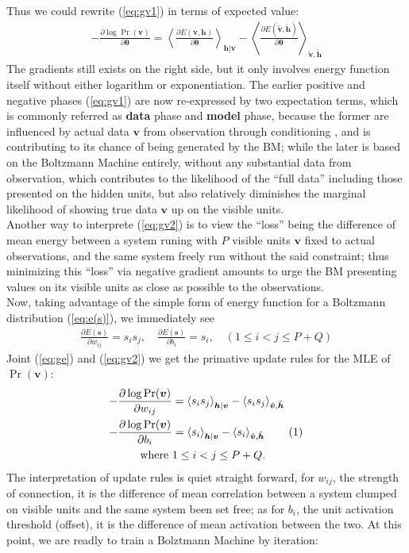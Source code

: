 \documentclass[11pt]{article}
\newcommand{\mean}[2]{\left\langle{#1}\right\rangle_{#2}}
\newcommand\numberthis{\addtocounter{equation}{1}\tag{\theequation}}
\newcommand{\vh}{\boldsymbol{h}}
\newcommand{\vv}{\boldsymbol{v}}
\newcommand{\vs}{\boldsymbol{s}}
\newcommand{\vht}{\tilde{\vh}}
\newcommand{\vvt}{\tilde{\vv}}
\newcommand{\pEC}{\boldsymbol{\theta}}
\newcommand{\PDV}[2]{\frac{\partial #1}{\partial #2}}
\begin{document}
Thus we could rewrite ({\ref{eq:gv1}) in terms of expected value:
\begin{align} \label{eq:gv2}
  -\PDV{\log{\Pr(\vv)}}{\pEC} = \mean{\PDV{E(\vv, \vh)}{\pEC}}{\vh|\vv} - \mean{\PDV{E(\vvt, \vht)}{\pEC}}{\vvt, \vht}
\end{align}
The gradients still exists on the right side, but it only involves energy function itself without either logarithm or exponentiation. The earlier positive and negative phases (\ref{eq:gv1}) are now re-expressed by two expectation terms, which is commonly referred as \textbf{data} phase and \textbf{model} phase, because the former are influenced by actual data $\vv$ from observation through conditioning , and is contributing to its chance of being generated by the BM; while the later is based on the Boltzmann Machine entirely, without any substantial data from observation, which contributes to the likelihood of the ``full data'' including those presented on the hidden units, but also relatively diminishes the marginal likelihood of showing true data $\vv$ up on the visible units. \\
Another way to interprete (\ref{eq:gv2}) is to view the ``loss'' being the difference of mean energy between a system runing with $P$ visible units $\vv$ fixed to actual observations, and the same system freely run without the said constraint; thus minimizing this ``loss'' via negative gradient amounts to urge the BM presenting values on its visible units as close as possible to the observations. \\
Now, taking advantage of the simple form of energy function for a Boltzmann distribution (\ref{eq:e(s)}), we immediately see
\begin{align} \label{eq:ge}
  \PDV{E(\vs)}{w_{ij}} = s_i s_j,  \quad \PDV{E(\vs)}{b_i} = s_i, \quad  (1 \le i < j \le P+Q)
\end{align}
Joint (\ref{eq:ge}) and (\ref{eq:gv2}) we get the primative update rules for the MLE of $\Pr(\vv)$:
\begin{align*} \label{eq:gv3}
  -\PDV{\log{\Pr(\vv)}}{w_{ij}} &= \mean{s_i s_j}{\vh|\vv} - \mean{s_i s_j}{\vvt, \vht} \\
  -\PDV{\log{\Pr(\vv)}}{b_i}    &= \mean{s_i}{\vh|\vv} - \mean{s_i}{\vvt, \vht} \numberthis \\
  \textrm{where }               & 1 \le i < j \le P+Q.
\end{align*}
The interpretation of update rules is quiet straight forward, for $w_{ij}$, the strength of connection, it is the difference of mean correlation between a system clumped on visible units and the same system been set free; as for $b_i$, the unit activation threshold (offset), it is the difference of mean activation between the two. At this point, we are readly to train a Bolztmann Machine by iteration:
}
\end{document}
